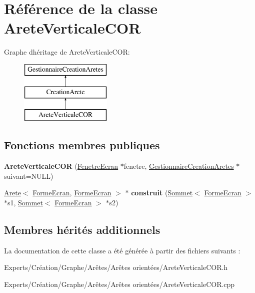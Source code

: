 \hypertarget{class_arete_verticale_c_o_r}{}\section{Référence de la classe Arete\+Verticale\+C\+OR}
\label{class_arete_verticale_c_o_r}
Graphe d\textquotesingle{}héritage de Arete\+Verticale\+C\+OR\+:\begin{figure}[H]
\begin{center}
\leavevmode
\includegraphics[height=3.000000cm]{class_arete_verticale_c_o_r}
\end{center}
\end{figure}
\subsection*{Fonctions membres publiques}
\begin{DoxyCompactItemize}
\item 
\mbox{\label{class_arete_verticale_c_o_r_a8c296e78e0dc3cb184480ced1064a458}} 
{\bfseries Arete\+Verticale\+C\+OR} (\mbox{\hyperlink{class_fenetre_ecran}{Fenetre\+Ecran}} $\ast$fenetre, \mbox{\hyperlink{class_gestionnaire_creation_aretes}{Gestionnaire\+Creation\+Aretes}} $\ast$suivant=N\+U\+LL)
\item 
\mbox{\label{class_arete_verticale_c_o_r_a781796fdc9597b2c962c208ea7fb41c1}} 
\mbox{\hyperlink{class_arete}{Arete}}$<$ \mbox{\hyperlink{class_forme_ecran}{Forme\+Ecran}}, \mbox{\hyperlink{class_forme_ecran}{Forme\+Ecran}} $>$ $\ast$ {\bfseries construit} (\mbox{\hyperlink{class_sommet}{Sommet}}$<$ \mbox{\hyperlink{class_forme_ecran}{Forme\+Ecran}} $>$ $\ast$s1, \mbox{\hyperlink{class_sommet}{Sommet}}$<$ \mbox{\hyperlink{class_forme_ecran}{Forme\+Ecran}} $>$ $\ast$s2)
\end{DoxyCompactItemize}
\subsection*{Membres hérités additionnels}


La documentation de cette classe a été générée à partir des fichiers suivants \+:\begin{DoxyCompactItemize}
\item 
Experts/\+Création/\+Graphe/\+Arêtes/\+Arêtes orientées/Arete\+Verticale\+C\+O\+R.\+h\item 
Experts/\+Création/\+Graphe/\+Arêtes/\+Arêtes orientées/Arete\+Verticale\+C\+O\+R.\+cpp\end{DoxyCompactItemize}
